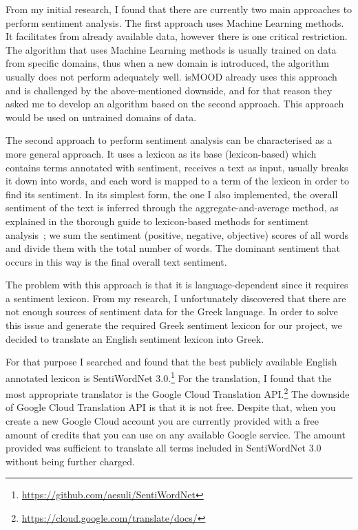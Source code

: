 From my initial research, I found that 
there are currently two main approaches
to perform sentiment analysis.
The first approach uses Machine Learning methods.
It facilitates from already available data,
however there is one critical restriction.
The algorithm that uses Machine Learning methods
is usually trained on data from specific domains,
thus when a new domain is introduced,
the algorithm usually does not perform adequately well.
isMOOD already uses this approach
and is challenged by the above-mentioned downside,
and for that reason they asked me to develop
an algorithm based on the second approach.
This approach would be used on untrained domains of data.

The second approach to perform sentiment analysis
can be characterised as a more general approach.
It uses a lexicon as its base (lexicon-based)
which contains terms annotated with sentiment,
receives a text as input, usually breaks it down into words,
and each word is mapped to a term of the lexicon
in order to find its sentiment.
In its simplest form, the one I also implemented,
the overall sentiment of the text is inferred
through the aggregate-and-average method,
as explained in the thorough guide
to lexicon-based methods for sentiment analysis~\cite{TBTV11};
we sum the sentiment (positive, negative, objective) scores
of all words and divide them with the total number of words.
The dominant sentiment that occurs in this way
is the final overall text sentiment.

The problem with this approach is that it is language-dependent
since it requires a sentiment lexicon.
From my research, I unfortunately discovered that there are
not enough sources of sentiment data for the Greek language.
In order to solve this issue
and generate the required Greek sentiment lexicon for our project,
we decided to translate an English sentiment lexicon into Greek.

For that purpose I searched and found
that the best publicly available English annotated lexicon
is SentiWordNet 3.0.\footnote{\url {https://github.com/aesuli/SentiWordNet}}
For the translation, I found that the most appropriate translator
is the Google Cloud Translation API.\footnote{\url {https://cloud.google.com/translate/docs/}}
The downside of Google Cloud Translation API is that it is not free.
Despite that, when you create a new Google Cloud account
you are currently provided with a free amount of credits
that you can use on any available Google service.
The amount provided was sufficient to translate all terms
included in SentiWordNet 3.0 without being further charged.

